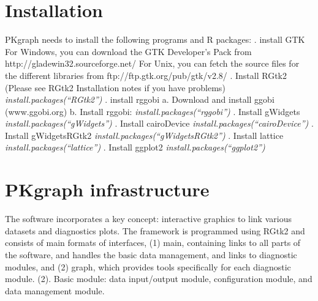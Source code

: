 \documentclass[a4paper]{article}
\begin{document}
\section{Installation}
PKgraph needs to install the following programs and R packages:
\newline {}. install GTK \newline
For Windows, you can download the GTK Developer's Pack from
\newline
   http://gladewin32.sourceforge.net/
\newline
\newline
For Unix, you can fetch the source files for the different
libraries from
\newline
   ftp://ftp.gtk.org/pub/gtk/v2.8/
\newline
{}. Install RGtk2 (Please see RGtk2 Installation notes if you have problems) \newline
\textit{install.packages(``RGtk2'')} \newline {}. install rggobi   \newline
a. Download and install ggobi (www.ggobi.org)  \newline
b. Install rggobi: \textit{install.packages(``rggobi'')} \newline {}. Install gWidgets  \newline
\textit{install.packages(``gWidgets'')} \newline {}. Install cairoDevice \newline
\textit{install.packages(``cairoDevice'')} \newline {}. Install gWidgetsRGtk2 \newline
\textit{install.packages(``gWidgetsRGtk2'')} \newline {}. Install lattice  \newline
\textit{install.packages(``lattice'')} \newline {}. Install ggplot2  \newline
\textit{install.packages(``ggplot2'')} \newline \newline
\section{PKgraph infrastructure}
The software incorporates a key concept: interactive graphics to link various datasets and diagnostics plots. The framework is programmed using RGtk2 and consists of main formats of interfaces,
(1) main, containing links to all parts of the software, and handles the basic data management, and links to diagnostic modules, and (2) graph, which provides tools specifically for each diagnostic module. (2). Basic module: data input/output module, configuration module, and data management module.
\newline
\newline
\end{document}
